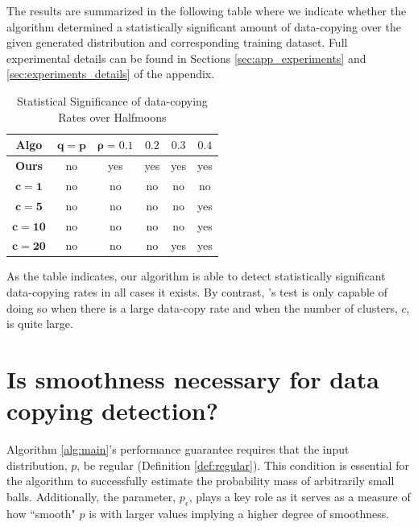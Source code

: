 The results are summarized in the following table where we indicate whether the algorithm determined a statistically significant amount of data-copying over the given generated distribution and corresponding training dataset. Full experimental details can be found in Sections \ref{sec:app_experiments} and \ref{sec:experiments_details} of the appendix.

\begin{table}[h]
\caption{Statistical Significance of data-copying Rates over Halfmoons} \label{results_main}
\begin{center}
\begin{tabular}{ |c||c|c|c|c|c| } 
 \hline
 \textbf{Algo} & $\mathbf{q = p}$ & $\mathbf{\rho = 0.1}$ & $\mathbf{0.2}$ & $\mathbf{0.3}$ & $\mathbf{0.4}$ \\ 
 \hline
 \hline
 \textbf{Ours} & \color{blue}no & \color{red}yes & \color{red}yes & \color{red}yes & \color{red}yes \\ 
 \hline
 $\mathbf{c=1}$ & \color{blue}no & \color{blue}no & \color{blue}no & \color{blue}no & \color{blue}no \\ 
 \hline
 $\mathbf{c=5}$ & \color{blue}no & \color{blue}no & \color{blue}no & \color{blue}no & \color{red}yes \\ 
 \hline
 $\mathbf{c=10}$ & \color{blue}no & \color{blue}no & \color{blue}no & \color{blue}no & \color{red}yes \\ 
 \hline
 $\mathbf{c=20}$ & \color{blue}no & \color{blue}no& \color{blue}no & \color{red}yes & \color{red}yes\\ 
 \hline
\end{tabular}
\end{center}
\end{table}

As the table indicates, our algorithm is able to detect statistically significant data-copying rates in all cases it exists. By contrast, \cite{MCD2020}'s test is only capable of doing so when there is a large data-copy rate and when the number of clusters, $c$, is quite large.

\section{Is smoothness necessary for data copying detection?}\label{sec:lower_bound}

Algorithm \ref{alg:main}'s performance guarantee requires that the input distribution, $p$, be regular (Definition \ref{def:regular}). This condition is essential for the algorithm to successfully estimate the probability mass of arbitrarily small balls. Additionally, the parameter, $p_\epsilon$, plays a key role as it serves as a measure of how ``smooth" $p$ is with larger values implying a higher degree of smoothness. 

